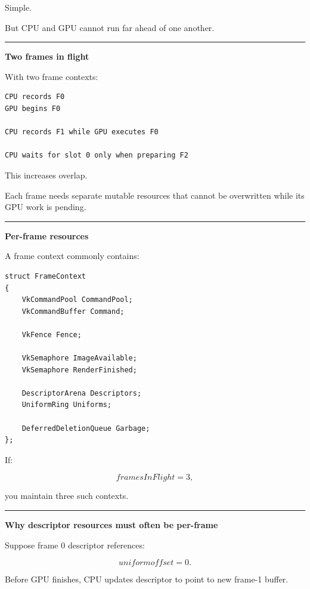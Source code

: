 Simple.

But CPU and GPU cannot run far ahead of one another.

\begin{center}\rule{0.5\linewidth}{0.5pt}\end{center}

\textbf{Two frames in flight}

With two frame contexts:

\begin{verbatim}
CPU records F0
GPU begins F0

CPU records F1 while GPU executes F0

CPU waits for slot 0 only when preparing F2
\end{verbatim}

This increases overlap.

Each frame needs separate mutable resources that cannot be overwritten while its GPU work is pending.

\begin{center}\rule{0.5\linewidth}{0.5pt}\end{center}

\textbf{Per-frame resources}

A frame context commonly contains:

\begin{verbatim}
struct FrameContext
{
    VkCommandPool CommandPool;
    VkCommandBuffer Command;

    VkFence Fence;

    VkSemaphore ImageAvailable;
    VkSemaphore RenderFinished;

    DescriptorArena Descriptors;
    UniformRing Uniforms;

    DeferredDeletionQueue Garbage;
};
\end{verbatim}

If:

\[
framesInFlight=3,
\]

you maintain three such contexts.

\begin{center}\rule{0.5\linewidth}{0.5pt}\end{center}

\textbf{Why descriptor resources must often be per-frame}

Suppose frame 0 descriptor references:

\[
uniform offset=0.
\]

Before GPU finishes, CPU updates descriptor to point to new frame-1 buffer.

